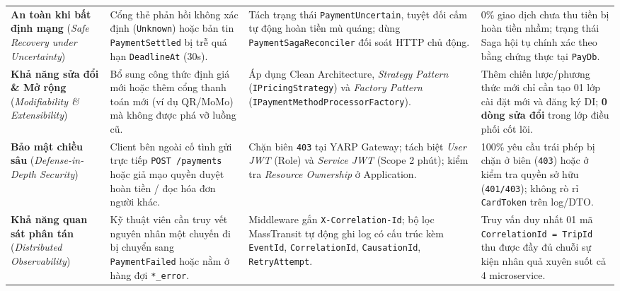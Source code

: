 \documentclass[12pt,a4paper]{article}
\newcommand{\ab}{\allowbreak}
\begin{document}
{\begin{longtable}{L{2.5cm} L{3.6cm} L{4.6cm} L{3.8cm}}
\textbf{An toàn khi bất định mạng} \newline (\textit{Safe Recovery under Uncertainty}) &
Cổng thẻ phản hồi không xác định (\texttt{Unknown}) hoặc bản tin \texttt{PaymentSettled} bị trễ quá hạn \texttt{DeadlineAt} (30s). &
Tách trạng thái \texttt{PaymentUncertain}, tuyệt đối cấm tự động hoàn tiền mù quáng; dùng \texttt{PaymentSaga\ab Reconciler} đối soát HTTP chủ động. &
0\% giao dịch chưa thu tiền bị hoàn tiền nhầm; trạng thái Saga hội tụ chính xác theo bằng chứng thực tại \texttt{PayDb}. \\
\addlinespace

\textbf{Khả năng sửa đổi \& Mở rộng} \newline (\textit{Modifiability \& Extensibility}) &
Bổ sung công thức định giá mới hoặc thêm cổng thanh toán mới (ví dụ QR/MoMo) mà không được phá vỡ luồng cũ. &
Áp dụng Clean Architecture, \textit{Strategy Pattern} (\texttt{IPricingStrategy}) và \textit{Factory Pattern} (\texttt{IPaymentMethod\ab ProcessorFactory}). &
Thêm chiến lược/phương thức mới chỉ cần tạo 01 lớp cài đặt mới và đăng ký DI; \textbf{0 dòng sửa đổi} trong lớp điều phối cốt lõi. \\
\addlinespace

\textbf{Bảo mật chiều sâu} \newline (\textit{Defense-in-Depth Security}) &
Client bên ngoài cố tình gửi trực tiếp \texttt{POST /payments} hoặc giả mạo quyền duyệt hoàn tiền / đọc hóa đơn người khác. &
Chặn biên \texttt{403} tại YARP Gateway; tách biệt \textit{User JWT} (Role) và \textit{Service JWT} (Scope 2 phút); kiểm tra \textit{Resource Ownership} ở Application. &
100\% yêu cầu trái phép bị chặn ở biên (\texttt{403}) hoặc ở kiểm tra quyền sở hữu (\texttt{401/403}); không rò rỉ \texttt{CardToken} trên log/DTO. \\
\addlinespace

\textbf{Khả năng quan sát phân tán} \newline (\textit{Distributed Observability}) &
Kỹ thuật viên cần truy vết nguyên nhân một chuyến đi bị chuyển sang \texttt{PaymentFailed} hoặc nằm ở hàng đợi \texttt{*\_error}. &
Middleware gắn \texttt{X-Correlation-Id}; bộ lọc MassTransit tự động ghi log có cấu trúc kèm \texttt{EventId}, \texttt{CorrelationId}, \texttt{CausationId}, \texttt{RetryAttempt}. &
Truy vấn duy nhất 01 mã \texttt{CorrelationId = TripId} thu được đầy đủ chuỗi sự kiện nhân quả xuyên suốt cả 4 microservice. \\
\end{longtable}
\renewcommand{\arraystretch}{1.0}
}
\end{document}
